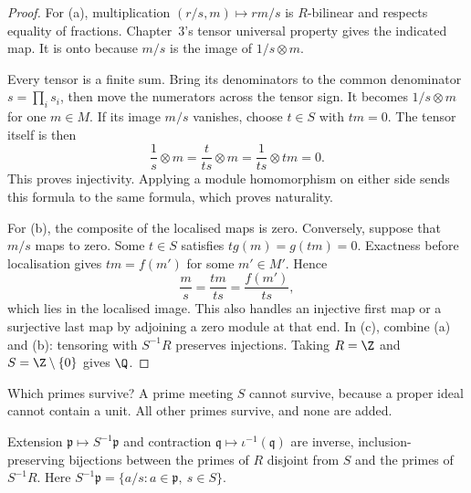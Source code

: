 \begin{proof}
For (a), multiplication $(r/s,m)\mapsto rm/s$ is $R$-bilinear and respects equality of fractions. Chapter~3's tensor universal property gives the indicated map. It is onto because $m/s$ is the image of $1/s\otimes m$.

Every tensor is a finite sum. Bring its denominators to the common denominator $s=\prod_i s_i$, then move the numerators across the tensor sign. It becomes $1/s\otimes m$ for one $m\in M$. If its image $m/s$ vanishes, choose $t\in S$ with $tm=0$. The tensor itself is then
\[
\frac1s\otimes m=\frac{t}{ts}\otimes m
 =\frac1{ts}\otimes tm=0.
\]
This proves injectivity. Applying a module homomorphism on either side sends this formula to the same formula, which proves naturality.

For (b), the composite of the localised maps is zero. Conversely, suppose that $m/s$ maps to zero. Some $t\in S$ satisfies $tg(m)=g(tm)=0$. Exactness before localisation gives $tm=f(m')$ for some $m'\in M'$. Hence
\[
\frac ms=\frac{tm}{ts}=\frac{f(m')}{ts},
\]
which lies in the localised image. This also handles an injective first map or a surjective last map by adjoining a zero module at that end. In (c), combine (a) and (b): tensoring with $S^{-1}R$ preserves injections. Taking $R=\Z$ and $S=\Z\setminus\{0\}$ gives $\Q$.
\end{proof}

Which primes survive? A prime meeting $S$ cannot survive, because a proper ideal cannot contain a unit. All other primes survive, and none are added.

\begin{theorem}\label{thm:locprimes}
Extension $\mathfrak p\mapsto S^{-1}\mathfrak p$ and contraction $\mathfrak q\mapsto\iota^{-1}(\mathfrak q)$ are inverse, inclusion-preserving bijections between the primes of $R$ disjoint from $S$ and the primes of $S^{-1}R$. Here $S^{-1}\mathfrak p=\{a/s:a\in\mathfrak p,\ s\in S\}$.
\end{theorem}

